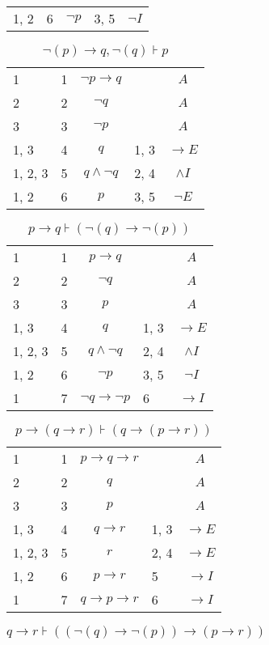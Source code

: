 \documentclass{article}
\begin{document}
\begin{table}[htbp]
\begin{tabular}{lllll}
{1, 2} & 6 & $$¬p$$ & {3, 5} & $$¬I$$ \\
\end{tabular}
\end{table}\begin{table}[htbp]\caption*{$¬(p)→q,¬(q) ⊦ p$}\centering\begin{tabular}{lllll}
{1} & 1 & $$¬p→q$$ & {} & $$A$$ \\
{2} & 2 & $$¬q$$ & {} & $$A$$ \\
{3} & 3 & $$¬p$$ & {} & $$A$$ \\
{1, 3} & 4 & $$q$$ & {1, 3} & $$→E$$ \\
{1, 2, 3} & 5 & $$q∧ ¬q$$ & {2, 4} & $$∧I$$ \\
{1, 2} & 6 & $$p$$ & {3, 5} & $$¬E$$ \\
\end{tabular}
\end{table}\begin{table}[htbp]\caption*{$p→q ⊦ (¬(q)→ ¬(p))$}\centering\begin{tabular}{lllll}
{1} & 1 & $$p→q$$ & {} & $$A$$ \\
{2} & 2 & $$¬q$$ & {} & $$A$$ \\
{3} & 3 & $$p$$ & {} & $$A$$ \\
{1, 3} & 4 & $$q$$ & {1, 3} & $$→E$$ \\
{1, 2, 3} & 5 & $$q∧ ¬q$$ & {2, 4} & $$∧I$$ \\
{1, 2} & 6 & $$¬p$$ & {3, 5} & $$¬I$$ \\
{1} & 7 & $$¬q→ ¬p$$ & {6} & $$→I$$ \\
\end{tabular}
\end{table}\begin{table}[htbp]\caption*{$p→(q→r) ⊦ (q→(p→r))$}\centering\begin{tabular}{lllll}
{1} & 1 & $$p→q→r$$ & {} & $$A$$ \\
{2} & 2 & $$q$$ & {} & $$A$$ \\
{3} & 3 & $$p$$ & {} & $$A$$ \\
{1, 3} & 4 & $$q→r$$ & {1, 3} & $$→E$$ \\
{1, 2, 3} & 5 & $$r$$ & {2, 4} & $$→E$$ \\
{1, 2} & 6 & $$p→r$$ & {5} & $$→I$$ \\
{1} & 7 & $$q→p→r$$ & {6} & $$→I$$ \\
\end{tabular}
\end{table}\begin{table}[htbp]\caption*{$q→r ⊦ ((¬(q)→ ¬(p))→ (p→r))$}\centering\begin{tabular}{lllll}

\end{tabular}
\end{table}
\end{document}
